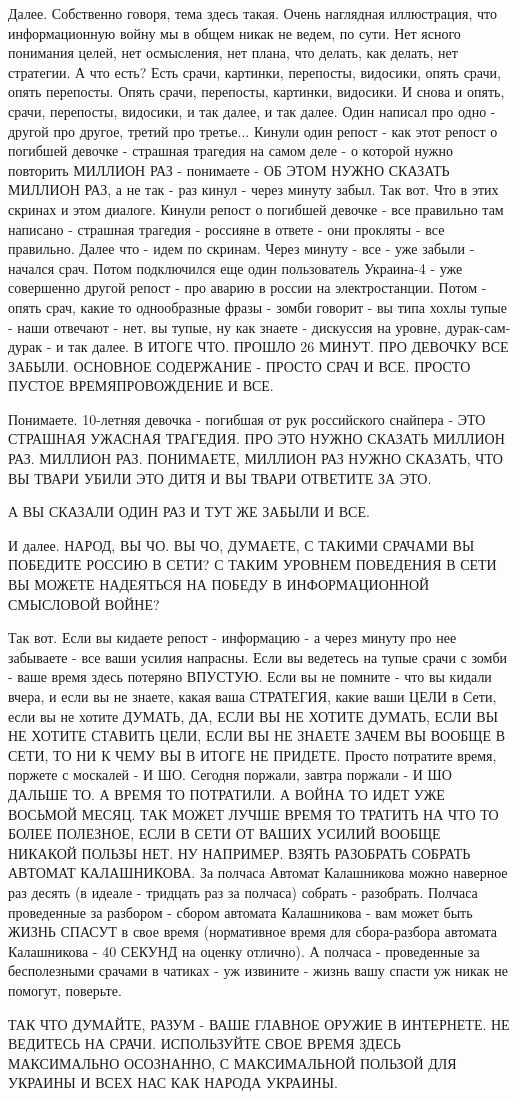 Далее. Собственно говоря, тема здесь такая. Очень наглядная иллюстрация, что
информационную войну мы в общем никак не ведем, по сути. Нет ясного понимания
целей, нет осмысления, нет плана, что делать, как делать, нет стратегии. А что
есть? Есть срачи, картинки, перепосты, видосики, опять срачи, опять перепосты.
Опять срачи, перепосты, картинки, видосики. И снова и опять, срачи, перепосты,
видосики, и так далее, и так далее. Один написал про одно - другой про другое,
третий про третье... Кинули один репост - как этот репост о погибшей девочке -
страшная трагедия на самом деле - о которой нужно повторить МИЛЛИОН РАЗ -
понимаете - ОБ ЭТОМ НУЖНО СКАЗАТЬ МИЛЛИОН РАЗ, а не так - раз кинул - через
минуту забыл. Так вот. Что в этих скринах и этом диалоге. Кинули репост о
погибшей девочке - все правильно там написано - страшная трагедия - россияне в
ответе - они прокляты - все правильно. Далее что - идем по скринам. Через
минуту - все - уже забыли - начался срач. Потом подключился еще один
пользователь Украина-4 - уже совершенно другой репост - про аварию в россии на
электростанции. Потом - опять срач, какие то однообразные фразы - зомби говорит
- вы типа хохлы тупые - наши отвечают - нет. вы тупые, ну как знаете -
дискуссия на уровне, дурак-сам-дурак - и так далее. В ИТОГЕ ЧТО. ПРОШЛО 26
МИНУТ. ПРО ДЕВОЧКУ ВСЕ ЗАБЫЛИ. ОСНОВНОЕ СОДЕРЖАНИЕ - ПРОСТО СРАЧ И ВСЕ. ПРОСТО
ПУСТОЕ ВРЕМЯПРОВОЖДЕНИЕ И ВСЕ. 

Понимаете. 10-летняя девочка - погибшая от рук российского снайпера - ЭТО
СТРАШНАЯ УЖАСНАЯ ТРАГЕДИЯ. ПРО ЭТО НУЖНО СКАЗАТЬ МИЛЛИОН РАЗ. МИЛЛИОН РАЗ.
ПОНИМАЕТЕ, МИЛЛИОН РАЗ НУЖНО СКАЗАТЬ, ЧТО ВЫ ТВАРИ УБИЛИ ЭТО ДИТЯ И ВЫ ТВАРИ
ОТВЕТИТЕ ЗА ЭТО.

А ВЫ СКАЗАЛИ ОДИН РАЗ И ТУТ ЖЕ ЗАБЫЛИ И ВСЕ.

И далее. НАРОД, ВЫ ЧО. ВЫ ЧО, ДУМАЕТЕ, С ТАКИМИ СРАЧАМИ ВЫ ПОБЕДИТЕ РОССИЮ В
СЕТИ? С ТАКИМ УРОВНЕМ ПОВЕДЕНИЯ В СЕТИ ВЫ МОЖЕТЕ НАДЕЯТЬСЯ НА ПОБЕДУ В
ИНФОРМАЦИОННОЙ СМЫСЛОВОЙ ВОЙНЕ?

Так вот. Если вы кидаете репост - информацию - а через минуту про нее забываете
- все ваши усилия напрасны. Если вы ведетесь на тупые срачи с зомби - ваше
время здесь потеряно ВПУСТУЮ. Если вы не помните - что вы кидали вчера, и если
вы не знаете, какая ваша СТРАТЕГИЯ, какие ваши ЦЕЛИ в Сети, если вы не хотите
ДУМАТЬ, ДА, ЕСЛИ ВЫ НЕ ХОТИТЕ ДУМАТЬ, ЕСЛИ ВЫ НЕ ХОТИТЕ СТАВИТЬ ЦЕЛИ, ЕСЛИ ВЫ
НЕ ЗНАЕТЕ ЗАЧЕМ ВЫ ВООБЩЕ В СЕТИ, ТО НИ К ЧЕМУ ВЫ В ИТОГЕ НЕ ПРИДЕТЕ. Просто
потратите время, поржете с москалей - И ШО. Сегодня поржали, завтра поржали - И
ШО ДАЛЬШЕ ТО. А ВРЕМЯ ТО ПОТРАТИЛИ. А ВОЙНА ТО ИДЕТ УЖЕ ВОСЬМОЙ МЕСЯЦ. ТАК
МОЖЕТ ЛУЧШЕ ВРЕМЯ ТО ТРАТИТЬ НА ЧТО ТО БОЛЕЕ ПОЛЕЗНОЕ, ЕСЛИ В СЕТИ ОТ ВАШИХ
УСИЛИЙ ВООБЩЕ НИКАКОЙ ПОЛЬЗЫ НЕТ. НУ НАПРИМЕР.  ВЗЯТЬ РАЗОБРАТЬ СОБРАТЬ АВТОМАТ
КАЛАШНИКОВА. За полчаса Автомат Калашникова можно наверное раз десять (в идеале
- тридцать раз за полчаса) собрать - разобрать.  Полчаса проведенные за
разбором - сбором автомата Калашникова - вам может быть ЖИЗНЬ СПАСУТ в свое
время (нормативное время для сбора-разбора автомата Калашникова - 40 СЕКУНД на
оценку отлично). А полчаса - проведенные за бесполезными срачами в чатиках - уж
извините - жизнь вашу спасти уж никак не помогут, поверьте.

ТАК ЧТО ДУМАЙТЕ, РАЗУМ - ВАШЕ ГЛАВНОЕ ОРУЖИЕ В ИНТЕРНЕТЕ.  НЕ ВЕДИТЕСЬ НА
СРАЧИ. ИСПОЛЬЗУЙТЕ СВОЕ ВРЕМЯ ЗДЕСЬ МАКСИМАЛЬНО ОСОЗНАННО, С МАКСИМАЛЬНОЙ
ПОЛЬЗОЙ ДЛЯ УКРАИНЫ И ВСЕХ НАС КАК НАРОДА УКРАИНЫ.
